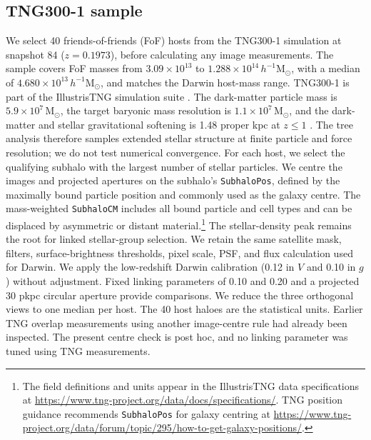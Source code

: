 \documentclass[usenatbib]{mnras}
\begin{document}
\subsection{TNG300-1 sample}
\label{sec:tngsample}

We select 40 friends-of-friends (FoF) hosts from the TNG300-1 simulation at
snapshot 84 ($z=0.1973$), before calculating any image measurements. The sample
covers FoF masses from $3.09\times10^{13}$ to
$1.288\times10^{14}\,h^{-1}\mathrm{M}_{\odot}$, with a median of
$4.680\times10^{13}\,h^{-1}\mathrm{M}_{\odot}$, and matches the Darwin host-mass
range. TNG300-1 is part of the IllustrisTNG simulation suite
\citep{nelson2019tng,pillepich2018tng,springel2018tng,nelson2018tng,naiman2018tng,marinacci2018tng}.
The dark-matter particle mass is $5.9\times10^{7}\,\mathrm{M}_{\odot}$,
the target baryonic mass resolution is $1.1\times10^{7}\,\mathrm{M}_{\odot}$,
and the dark-matter and stellar gravitational softening is 1.48 proper kpc
at $z\leq1$ \citep{nelson2018tng}. The tree analysis therefore samples
extended stellar structure at finite particle and force resolution; we do
not test numerical convergence.
For each host, we select the qualifying subhalo with the largest number of
stellar particles. We centre the images and projected apertures on the
subhalo's \texttt{SubhaloPos}, defined by the maximally bound particle
position and commonly used as the galaxy centre. The mass-weighted
\texttt{SubhaloCM} includes all bound particle and cell types and can be
displaced by asymmetric or distant material.\footnote{The field definitions
and units appear in the IllustrisTNG data specifications at
\url{https://www.tng-project.org/data/docs/specifications/}. TNG position
guidance recommends \texttt{SubhaloPos} for galaxy centring at
\url{https://www.tng-project.org/data/forum/topic/295/how-to-get-galaxy-positions/}.}
The stellar-density peak remains the root for linked stellar-group
selection. We retain the same satellite mask, filters, surface-brightness
thresholds, pixel scale, PSF, and flux calculation used for Darwin. We
apply the low-redshift Darwin calibration (0.12 in $V$ and 0.10 in $g$)
without adjustment. Fixed linking parameters of 0.10 and 0.20 and a
projected 30 pkpc circular aperture provide comparisons. We reduce the
three orthogonal views to one median per host. The 40 host haloes are the
statistical units. Earlier TNG overlap measurements using another image-centre rule had
already been inspected. The present centre check is post hoc, and no
linking parameter was tuned using TNG measurements.
\end{document}
